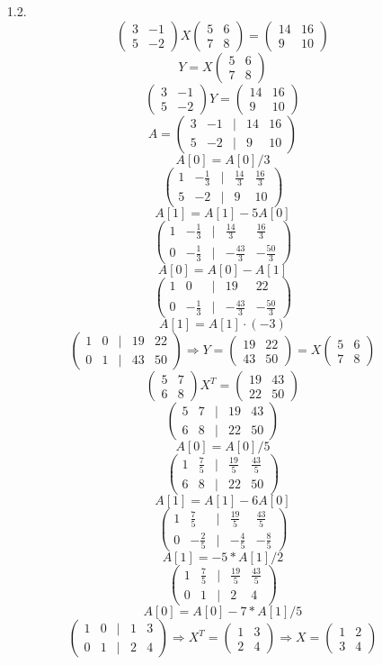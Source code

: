 \documentclass[a4paper]{article}
\newcommand{\mat}[1]{\begin{pmatrix} #1 \end{pmatrix}}
\renewcommand{\f}[2]{\frac{#1}{#2}}
\renewcommand{\r}{\Rightarrow}
\begin{document}
\begin{enumerate}
\begin{enumerate}
        \item[1.2.]
        $$\mat{3 & -1 \\ 5 & -2} X \mat{5 & 6 \\ 7 & 8} = \mat{14 & 16 \\ 9 & 10}$$
        $$Y = X \mat{5 & 6 \\ 7 & 8}$$
        $$\mat{3 & -1 \\ 5 & -2} Y = \mat{14 & 16 \\ 9 & 10}$$
        $$A = \mat{3 & -1 & | & 14 & 16\\ 5 & -2 & | & 9 & 10}$$
        $$A[0] = A[0]/3$$
        $$\mat{1 & -\f{1}{3} & | & \f{14}{3} & \f{16}{3}\\ 5 & -2 & | & 9 & 10}$$
        $$A[1] = A[1]- 5A[0]$$
        $$\mat{1 & -\f{1}{3} & | & \f{14}{3} & \f{16}{3}\\ 0 & -\f{1}{3} & | & -\f{43}{3} & -\f{50}{3}}$$
        $$A[0] = A[0]-A[1]$$
        $$\mat{1 & 0 & | & 19 & 22\\ 0 & -\f{1}{3} & | & -\f{43}{3} & -\f{50}{3}}$$
        $$A[1] = A[1]\cdot(-3)$$
        $$\mat{1 & 0 & | & 19 & 22\\ 0 & 1 & | & 43 & 50} \r Y = \mat{19 & 22 \\ 43 & 50} = X \mat{5 & 6 \\ 7 & 8}$$
        $$\mat{5 & 7 \\ 6 & 8}X^T = \mat{19 & 43 \\ 22 & 50}$$
        $$\mat{5 & 7 & | & 19 & 43\\ 6 & 8 & | & 22 & 50}$$
        $$A[0] = A[0]/5$$
        $$\mat{1 & \f{7}{5} & | & \f{19}{5} & \f{43}{5}\\ 6 & 8 & | & 22 & 50}$$
        $$A[1] = A[1]-6A[0]$$
        $$\mat{1 & \f{7}{5} & | & \f{19}{5} & \f{43}{5} \\ 0 & -\f{2}{5} & | & -\f{4}{5} & -\f{8}{5}}$$
        $$A[1] = -5*A[1]/2$$
        $$\mat{1 & \f{7}{5} & | & \f{19}{5} & \f{43}{5} \\ 0 & 1 & | & 2 & 4}$$
        $$A[0] = A[0]-7*A[1]/5$$
        $$\mat{1 & 0 & | & 1 & 3 \\ 0 & 1 & | & 2 & 4} \r X^T = \mat{1 & 3 \\ 2 & 4} \r X = \mat{1 & 2 \\ 3 & 4}$$
    

\end{enumerate}
\end{enumerate}
\end{document}
